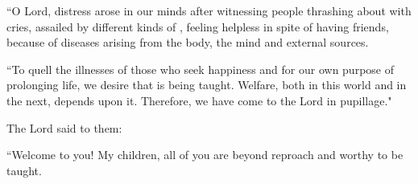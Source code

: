\begin{translation}
    \item[3]
    
 “O Lord, distress arose in our minds after witnessing people
thrashing about with cries, assailed by different kinds of
, feeling helpless in spite of
having friends, because of diseases arising from the body, the mind
and external sources.
    
    
    
    
    \let\uncertain\texttt
    
    \item[4] 
    
“To quell the illnesses of those who seek happiness and for our own
purpose of prolonging life, we desire  that is being taught. Welfare, both in
this world and in the next, depends upon it. Therefore, we have come
to the Lord in pupillage." %
    
    
    \item[5] 
    
The Lord said to them:
    
“Welcome to you!  My children, all of you are beyond reproach and
worthy to be taught.
    
    
    \item[6] 
    

\end{translation}
